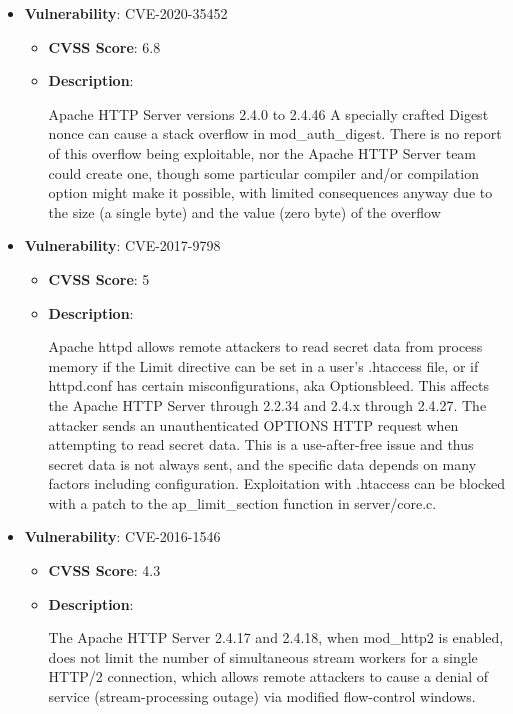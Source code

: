 \documentclass{article}
\begin{document}
\begin{itemize}
        \item \textbf{Vulnerability}: CVE-2020-35452
        \begin{itemize}
            \item \textbf{CVSS Score}:  6.8 
            \item \textbf{Description}:
            \parbox[t]{0.9\linewidth}{
                \ttfamily Apache HTTP Server versions 2.4.0 to 2.4.46 A specially crafted Digest nonce can cause a stack overflow in mod\_auth\_digest. There is no report of this overflow being exploitable, nor the Apache HTTP Server team could create one, though some particular compiler and/or compilation option might make it possible, with limited consequences anyway due to the size (a single byte) and the value (zero byte) of the overflow
            }
        \end{itemize}
    
        \item \textbf{Vulnerability}: CVE-2017-9798
        \begin{itemize}
            \item \textbf{CVSS Score}:  5 
            \item \textbf{Description}:
            \parbox[t]{0.9\linewidth}{
                \ttfamily Apache httpd allows remote attackers to read secret data from process memory if the Limit directive can be set in a user's .htaccess file, or if httpd.conf has certain misconfigurations, aka Optionsbleed. This affects the Apache HTTP Server through 2.2.34 and 2.4.x through 2.4.27. The attacker sends an unauthenticated OPTIONS HTTP request when attempting to read secret data. This is a use-after-free issue and thus secret data is not always sent, and the specific data depends on many factors including configuration. Exploitation with .htaccess can be blocked with a patch to the ap\_limit\_section function in server/core.c.
            }
        \end{itemize}
    
        \item \textbf{Vulnerability}: CVE-2016-1546
        \begin{itemize}
            \item \textbf{CVSS Score}:  4.3 
            \item \textbf{Description}:
            \parbox[t]{0.9\linewidth}{
                \ttfamily The Apache HTTP Server 2.4.17 and 2.4.18, when mod\_http2 is enabled, does not limit the number of simultaneous stream workers for a single HTTP/2 connection, which allows remote attackers to cause a denial of service (stream-processing outage) via modified flow-control windows.
            }
        \end{itemize}
    

\end{itemize}
\end{document}
